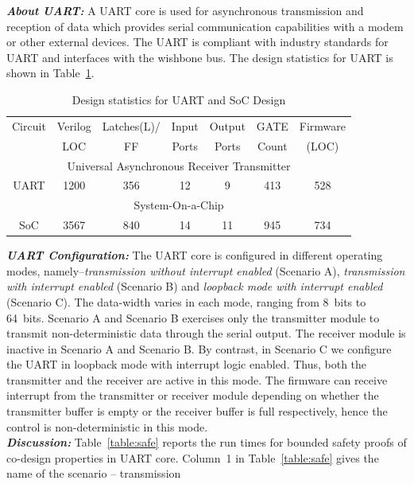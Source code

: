 \documentclass[sigconf]{acmart}
\begin{document}
\textbf{\emph{About UART:}} A UART  core is used for asynchronous
transmission and reception of data which provides serial communication
capabilities with a modem or other external devices.  The UART  is
compliant with industry standards for UART and interfaces with the wishbone
bus.  The design statistics for UART is shown in Table~\ref{table:stats}. \\
%
\begin{table}
\begin{center}
{
\small
\begin{tabular}{|c|c|c|c|c|c|c|}
\hline
  Circuit & Verilog & Latches(L)/ & Input & Output & GATE & Firmware \\
  & LOC & FF & Ports & Ports & Count & (LOC)\\ 
\cline{1-7}
\multicolumn{7}{|c|}{Universal Asynchronous Receiver Transmitter} \\ \hline 
  UART & 1200 & 356 & 12 & 9 & 413 & 528 \\ \hline
\multicolumn{7}{|c|}{System-On-a-Chip} \\ \hline 
  SoC & 3567 & 840 & 14 & 11 & 945 & 734 \\ \hline
\end{tabular}
}
\end{center}
\caption{Design statistics for UART and SoC Design}
\label{table:stats}
\end{table}  
%
\textbf{\emph{UART Configuration:}} The UART  core is configured in
different operating modes, namely--{\em transmission without interrupt
enabled} (Scenario A), {\em transmission with interrupt enabled} (Scenario
B) and {\em loopback mode with interrupt enabled} (Scenario C).  The
data-width varies in each mode, ranging from 8~bits to 64~bits.  Scenario A
and Scenario B exercises only the transmitter module to transmit
non-deterministic data through the serial output.  The receiver module is
inactive in Scenario A and Scenario B.  By contrast, in Scenario C we
configure the UART in loopback mode with interrupt logic enabled.  Thus,
both the transmitter and the receiver are active in this mode.  The firmware
can receive interrupt from the transmitter or receiver module depending on
whether the transmitter buffer is empty or the receiver buffer is full
respectively, hence the control is non-deterministic in this mode. \\
%
\textbf{\emph{Discussion:}}
Table~\ref{table:safe} reports the run times for bounded safety proofs of 
co-design properties in UART  core.  Column~1 in Table~\ref{table:safe} 
gives the name of the scenario -- transmission
\end{document}
